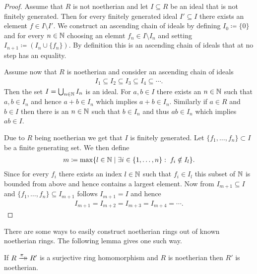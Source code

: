 \documentclass[../notes.tex]{subfiles}
\begin{document}
\begin{proof}
  Assume that $R$ is not noetherian and let $I \subseteq R$ be an ideal that is not finitely
  generated. Then for every finitely generated ideal $I' \subseteq I$ there exists an
  element $f \in I \setminus I'$. We construct an ascending chain of ideals by defining
  $I_0 \coloneqq \{0\}$ and for every $n \in {\mathbb{N}}$ choosing an elemnt $f_n \in I \setminus I_n$
  and setting $I_{n+1} \coloneqq (I_n \cup \{f_n\})$. By definition this is an ascending
  chain of ideals that at no step has an equality.

  \smallskip
  \noindent
  Assume now that $R$ is noetherian and consider an ascending chain of ideals
  \begin{align*}
    I_1 \subseteq I_2 \subseteq I_3 \subseteq I_4 \subseteq \cdots.
  \end{align*}
  Then the set $I = \bigcup_{n \in {\mathbb{N}}} I_n$ is an ideal. For $a,b \in I$ there exists an
  $n \in {\mathbb{N}}$ such that $a,b \in I_n$ and hence $a + b \in I_n$ which implies $a + b \in I_n$.
  Similarly if $a \in R$ and $b \in I$ then there is an $n \in {\mathbb{N}}$ such that $b \in I_n$
  and thus $ab \in I_n$ which implies $ab \in I$.

  \noindent
  Due to $R$ being noetherian we get that $I$ is finitely generated. Let
  $\{f_1, \dots, f_n\} \subset I$ be a finite generating set. We then define
  \begin{align*}
    m \coloneqq \max \{l \in {\mathbb{N}} \mid \exists i \in \{1, \dots, n\}: \; f_i \notin I_l\}.
  \end{align*}
  Since for every $f_i$ there exists an index $l \in {\mathbb{N}}$ such that $f_i \in I_l$ this subset
  of ${\mathbb{N}}$ is bounded from above and hence contains a largest element.
  Now from $I_{m+1} \subseteq I$ and $\{f_1, \dots, f_n\} \subseteq I_{m+1}$ follows
  $I_{m+1} = I$ and hence
  \begin{align*}
    I_{m+1} = I_{m+2} = I_{m+3} = I_{m+4} = \cdots.
  \end{align*}
  
\end{proof}

\smallskip
\noindent
There are some ways to easily construct noetherian rings out of known noetherian rings.
The following lemma gives one such way.

\smallskip
\begin{lemm}{}{}
  If $R \xrightarrow[]{\pi}\mathrel{\mkern-14mu}\rightarrow R'$ is a surjective ring homomorphism and $R$ is
  noetherian then $R'$ is noetherian.
\end{lemm}
\end{document}
